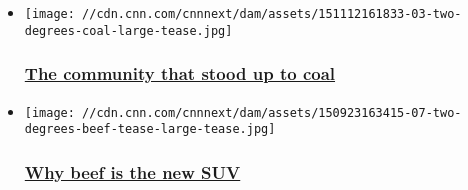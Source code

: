 \begin{itemize}
\item
  \href{/2015/11/23/opinions/sutter-coal-montana-two-degrees/index.html}{}

  \texttt{[image: //cdn.cnn.com/cnnnext/dam/assets/151112161833-03-two-degrees-coal-large-tease.jpg]}

  \hypertarget{the-community-that-stood-up-to-coal}{%
  \subsubsection{\texorpdfstring{\href{/2015/11/23/opinions/sutter-coal-montana-two-degrees/index.html}{The
  community that stood up to
  coal}}{The community that stood up to coal}}\label{the-community-that-stood-up-to-coal}}
\item
  \href{/2015/09/29/opinions/sutter-beef-suv-cliamte-two-degrees/index.html}{}

  \texttt{[image: //cdn.cnn.com/cnnnext/dam/assets/150923163415-07-two-degrees-beef-tease-large-tease.jpg]}

  \hypertarget{why-beef-is-the-new-suv}{%
  \subsubsection{\texorpdfstring{\href{/2015/09/29/opinions/sutter-beef-suv-cliamte-two-degrees/index.html}{Why
  beef is the new
  SUV}}{Why beef is the new SUV}}\label{why-beef-is-the-new-suv}}
\end{itemize}

